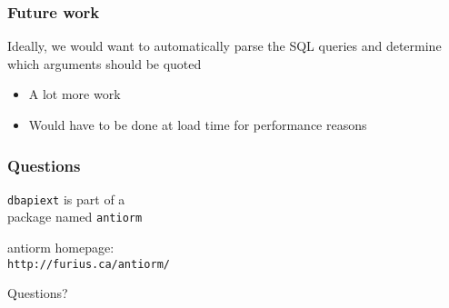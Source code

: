 \documentclass{beamer}
\begin{document}
\begin{frame}[fragile]
  \frametitle{Future work}

Ideally, we would want to automatically parse the SQL queries and
determine which arguments should be quoted 

  \begin{itemize}
  \item A lot more work
  \item Would have to be done at load time for performance reasons
  \end{itemize}
  

\end{frame}



\begin{frame}[fragile]
  \frametitle{Questions}

  \begin{center}


{\Large
\texttt{dbapiext} is part of a \\
package named \texttt{antiorm}
}

\vfill

{\LARGE
antiorm homepage: \\
\verb=http://furius.ca/antiorm/=
}

\vfill

{\LARGE Questions?}

  \end{center}

\end{frame}


\end{document}
